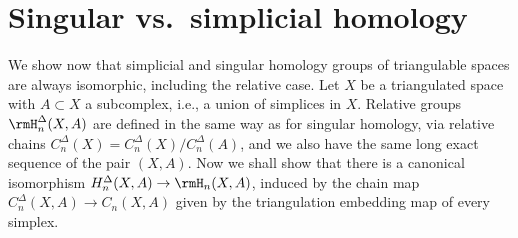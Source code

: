 \section{Singular vs.~simplicial homology}

We show now that simplicial and singular homology groups of triangulable spaces are always isomorphic, including the relative case. Let $X$ be a triangulated space with $A\subset X$ a subcomplex, i.e., a union of simplices in $X$. Relative groups $\rmH^{\Delta}_n(X,A)$ are defined in the same way as for singular homology, via relative chains $C^\Delta_n(X)=C^\Delta_n(X)/C^\Delta_n(A)$, and we also have the same long exact sequence of the pair $(X,A)$. Now we shall show that there is a canonical isomorphism $H^\Delta_n(X,A)\to \rmH_n(X,A)$, induced by the chain map $C_n^\Delta(X,A)\to C_n(X,A)$ given by the triangulation embedding map of every simplex. 

